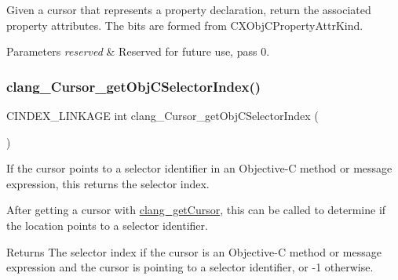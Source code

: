Given a cursor that represents a property declaration, return the associated property attributes. The bits are formed from {\ttfamily C\+X\+Obj\+C\+Property\+Attr\+Kind}. 


\begin{DoxyParams}{Parameters}
{\em reserved} & Reserved for future use, pass 0. \\
\hline
\end{DoxyParams}
\mbox{\label{group__CINDEX__CURSOR__XREF_ga3ea92edf682a5a734e5f4d0c2217f0b8}} 
\subsubsection{\texorpdfstring{clang\+\_\+\+Cursor\+\_\+get\+Obj\+C\+Selector\+Index()}{clang\_Cursor\_getObjCSelectorIndex()}}
{\footnotesize\ttfamily C\+I\+N\+D\+E\+X\+\_\+\+L\+I\+N\+K\+A\+GE int clang\+\_\+\+Cursor\+\_\+get\+Obj\+C\+Selector\+Index (\begin{DoxyParamCaption}\item[{\mbox{\hyperlink{structCXCursor}{C\+X\+Cursor}}}]{ }\end{DoxyParamCaption})}



If the cursor points to a selector identifier in an Objective-\/C method or message expression, this returns the selector index. 

After getting a cursor with \mbox{\hyperlink{group__CINDEX__CURSOR__SOURCE_ga30a9972c7e099ab2735fa6c45e247ec8}{clang\+\_\+get\+Cursor}}, this can be called to determine if the location points to a selector identifier.

\begin{DoxyReturn}{Returns}
The selector index if the cursor is an Objective-\/C method or message expression and the cursor is pointing to a selector identifier, or -\/1 otherwise. 
\end{DoxyReturn}
\mbox{\label{group__CINDEX__CURSOR__XREF_ga251b31de80fd14681edf46f43b0bd03b}} 
